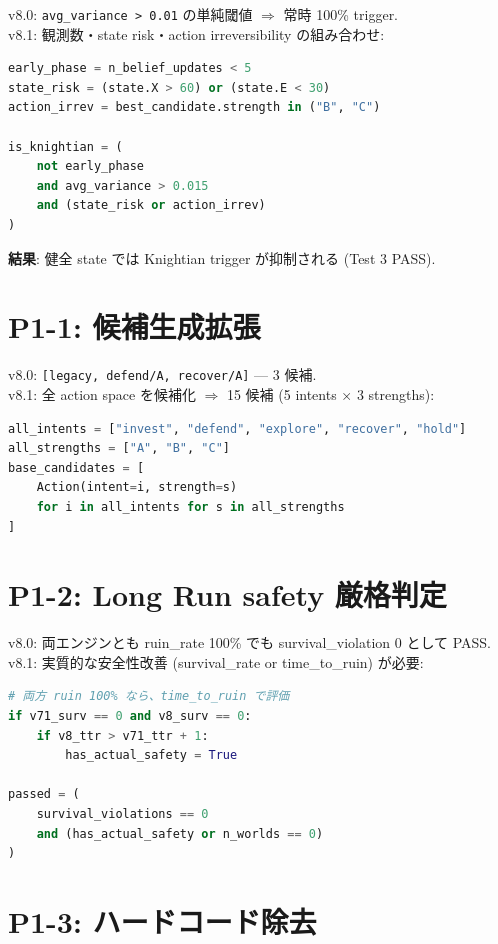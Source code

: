 \documentclass[a4paper,11pt]{report}
\begin{document}
v8.0: \texttt{avg\_variance > 0.01} の単純閾値 \(\Rightarrow\) 常時 100\% trigger.\\
v8.1: 観測数・state risk・action irreversibility の組み合わせ:

\begin{lstlisting}[language=Python]
early_phase = n_belief_updates < 5
state_risk = (state.X > 60) or (state.E < 30)
action_irrev = best_candidate.strength in ("B", "C")

is_knightian = (
    not early_phase
    and avg_variance > 0.015
    and (state_risk or action_irrev)
)
\end{lstlisting}

\textbf{結果}: 健全 state では Knightian trigger が抑制される (Test 3 PASS).

\section{P1-1: 候補生成拡張}

v8.0: \texttt{[legacy, defend/A, recover/A]} — 3 候補.\\
v8.1: 全 action space を候補化 \(\Rightarrow\) 15 候補 (5 intents × 3 strengths):

\begin{lstlisting}[language=Python]
all_intents = ["invest", "defend", "explore", "recover", "hold"]
all_strengths = ["A", "B", "C"]
base_candidates = [
    Action(intent=i, strength=s)
    for i in all_intents for s in all_strengths
]
\end{lstlisting}

\section{P1-2: Long Run safety 厳格判定}

v8.0: 両エンジンとも ruin\_rate 100\% でも survival\_violation 0 として PASS.\\
v8.1: 実質的な安全性改善 (survival\_rate or time\_to\_ruin) が必要:

\begin{lstlisting}[language=Python]
# 両方 ruin 100% なら、time_to_ruin で評価
if v71_surv == 0 and v8_surv == 0:
    if v8_ttr > v71_ttr + 1:
        has_actual_safety = True

passed = (
    survival_violations == 0
    and (has_actual_safety or n_worlds == 0)
)
\end{lstlisting}

\section{P1-3: ハードコード除去}
\end{document}
